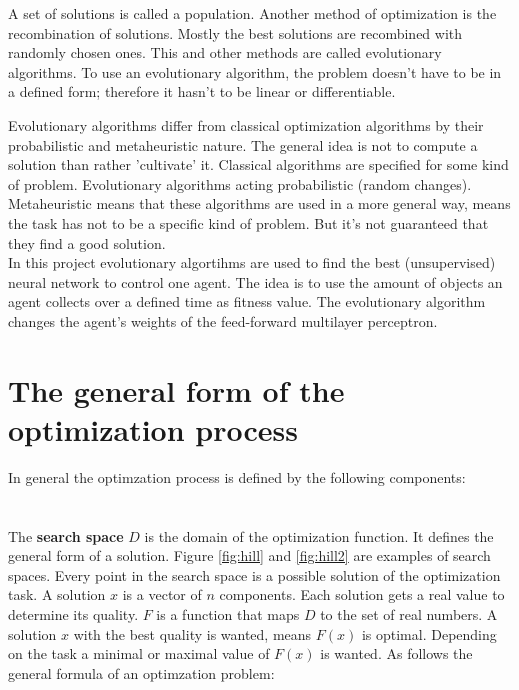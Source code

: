 \documentclass[10pt,a4paper,DIV=11]{scrreprt}
\begin{document}
A set of solutions is called a population. Another method of optimization is the recombination of solutions. Mostly the best solutions are recombined with randomly chosen
ones. This and other methods are called evolutionary algorithms. To use an evolutionary algorithm, the problem doesn't have to be in a defined form;
therefore it hasn't to be linear or differentiable.

Evolutionary algorithms differ from classical optimization algorithms by their probabilistic and metaheuristic nature. The general idea is not to compute a solution than rather 'cultivate' it. Classical algorithms are specified for some kind of problem. Evolutionary algorithms acting probabilistic (random changes). Metaheuristic means that these algorithms are used in a more general way, means the task has not to be a specific kind of problem. But it's not guaranteed that they find a good solution. \\


In this project evolutionary algortihms are used to find the best 
(unsupervised) neural network to control one agent. The idea is to use the amount of objects an agent collects over a defined time as fitness value. The evolutionary algorithm changes the agent's weights of the feed-forward multilayer perceptron.

\section{The general form of the optimization process}
In general the optimzation process is defined by the following components: \\

   \\
\\

The \textbf{search space} $D$ is the domain of the optimization function. It defines the general form of a solution. Figure \ref{fig:hill} and \ref{fig:hill2} are examples of search spaces. Every point in the search space is a possible solution of the optimization task.
A solution $x$ is a vector of $n$ components. Each solution gets a real value to determine its quality. $F$ is a function that maps $D$ to the set of real numbers. A solution $x$ with the best quality is wanted, means $F(x)$ is optimal. Depending on the task a minimal or maximal value of $F(x)$ is wanted. As follows the general formula of an optimzation problem:
\end{document}
